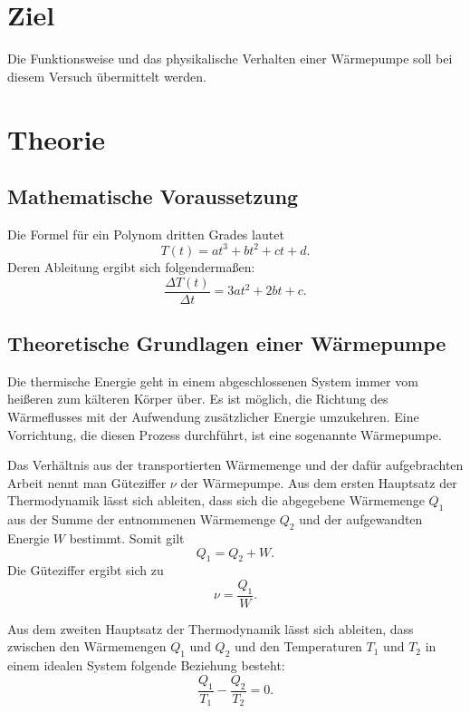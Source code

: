 \section{Ziel}
\label{sec:Ziel}

Die Funktionsweise und das physikalische Verhalten einer Wärmepumpe soll bei diesem 
Versuch übermittelt werden.

\section{Theorie}
\label{sec:Theorie}

\subsection{Mathematische Voraussetzung}
Die Formel für ein Polynom dritten Grades lautet 
\begin{equation}
    T(t)= at^3+bt^2+ct+d.
    \label{eqn:poly3}
\end{equation}
Deren Ableitung ergibt sich folgendermaßen: 
\begin{equation}
    \frac{\Delta T(t)}{\Delta t}=3at^2+2bt+c.
    \label{eqn:poly3ableitung}
\end{equation}
\subsection{Theoretische Grundlagen einer Wärmepumpe}
Die thermische Energie geht in einem abgeschlossenen System immer vom heißeren zum 
kälteren Körper über. Es ist möglich, die Richtung des Wärmeflusses mit der Aufwendung 
zusätzlicher Energie umzukehren. Eine Vorrichtung, die diesen Prozess durchführt, ist 
eine sogenannte Wärmepumpe. 

\noindent Das Verhältnis aus der transportierten Wärmemenge und der dafür aufgebrachten 
Arbeit nennt man Güteziffer $\nu$ der Wärmepumpe. Aus dem ersten Hauptsatz der 
Thermodynamik lässt sich ableiten, dass sich die abgegebene Wärmemenge $Q_1$ aus der 
Summe der entnommenen Wärmemenge $Q_2$ und der aufgewandten Energie $W$ bestimmt. 
Somit gilt
\begin{equation*}
    Q_1 = Q_2 + W.
\end{equation*} 
Die Güteziffer ergibt sich zu 
\begin{equation*}
    \nu = \frac{Q_1}{W}.
\end{equation*}

\noindent Aus dem zweiten Hauptsatz der Thermodynamik lässt sich ableiten, dass zwischen den Wärmemengen 
$Q_1$ und $Q_2$ und den Temperaturen $T_1$ und $T_2$ in einem idealen System folgende 
Beziehung besteht:
\begin{equation*}
    \frac{Q_1}{T_1} - \frac{Q_2}{T_2} = 0.
\end{equation*}


